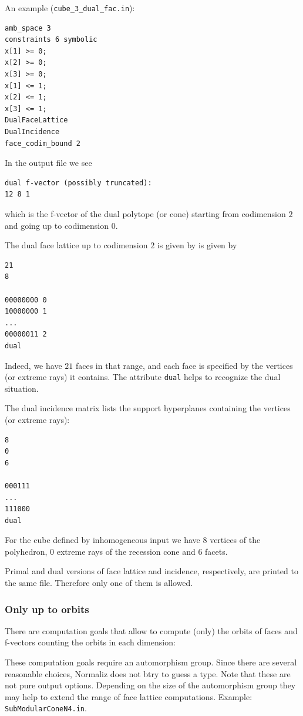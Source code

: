 An example (\verb|cube_3_dual_fac.in|):
\begin{Verbatim}
amb_space 3
constraints 6 symbolic
x[1] >= 0;
x[2] >= 0;
x[3] >= 0;
x[1] <= 1;
x[2] <= 1;
x[3] <= 1;
DualFaceLattice
DualIncidence
face_codim_bound 2
\end{Verbatim}

In the output file we see
\begin{Verbatim}
dual f-vector (possibly truncated):
12 8 1
\end{Verbatim}
which is the f-vector of the dual polytope (or cone) starting from codimension $2$ and going up to codimension $0$.

The dual face lattice up to codimension $2$ is given by is given by
\begin{Verbatim}
21
8

00000000 0
10000000 1
...
00000011 2
dual
\end{Verbatim}
Indeed, we have $21$ faces in that range, and each face is specified by the vertices (or extreme rays) it contains. The attribute \verb|dual| helps to recognize the dual situation.

The dual incidence matrix lists the support hyperplanes containing the vertices (or extreme rays):
\begin{Verbatim}
8
0
6

000111
...
111000
dual
\end{Verbatim}
For the cube defined by inhomogeneous input we have $8$ vertices of the polyhedron, $0$ extreme rays of the recession cone and $6$ facets.

Primal and dual versions of face lattice and incidence, respectively, are printed to the same file. Therefore only one of them is allowed.

\subsubsection{Only up to orbits}

There are computation goals that allow to compute (only) the orbits of faces and f-vectors counting the orbits in each dimension:
\begin{itemize}
	\itemtt[FaceLatticeOrbits]
	\itemtt[FVectorOrbits]
	\itemtt[DualFaceLatticeOrbits]
	\itemtt[DualFVectorOrbits]
\end{itemize}

These computation goals require an automorphism group. Since there are several reasonable choices, Normaliz does not btry to guess a type. Note that these are not pure output options. Depending on the size of the automorphism group they may help to extend the range of face lattice computations. Example: \verb*|SubModularConeN4.in|.

